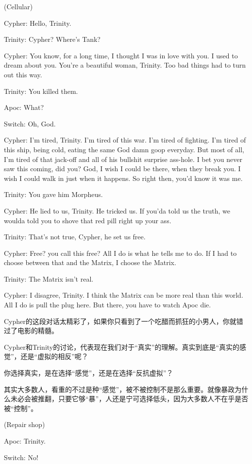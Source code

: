 \documentclass{ctexart}
\newenvironment{myquote}{\color{green} \setlength{\leftskip}{6em} \setlength{\rightskip}{4em} \setlength{\parindent}{-2em}}{\par}
\begin{document}
\begin{myquote}
(Cellular)

Cypher: Hello, Trinity.

Trinity: Cypher? Where's Tank?

Cypher: You know, for a long time, I thought I was in love with you. I used to dream about you. You're a beautiful woman, Trinity. Too bad things had to turn out this way.

Trinity: You killed them.

Apoc: What?

Switch: Oh, God.

Cypher: I'm tired, Trinity. I'm tired of this war. I'm tired of fighting. I'm tired of this ship, being cold, eating the same God damn goop everyday. But most of all, I'm tired of that jack-off and all of his bullshit surprise ass-hole. I bet you never saw this coming, did you? God, I wish I could be there, when they break you. I wish I could walk in just when it happens. So right then, you'd know it was me.

Trinity: You gave him Morpheus.

Cypher: He lied to us, Trinity. He tricked us. If you'da told us the truth, we woulda told you to shove that red pill right up your ass.

Trinity: That's not true, Cypher, he set us free.

Cypher: Free? you call this free? All I do is what he tells me to do. If I had to choose between that and the Matrix, I choose the Matrix.

Trinity: The Matrix isn't real.

Cypher: I disagree, Trinity. I think the Matrix can be more real than this world. All I do is pull the plug here. But there, you have to watch Apoc die.
\end{myquote}

Cypher的这段对话太精彩了，如果你只看到了一个吃醋而抓狂的小男人，你就错过了电影的精髓。

Cypher和Trinity的讨论，代表现在我们对于“真实”的理解。真实到底是“真实的感觉”，还是“虚拟的相反”呢？

你选择真实，是在选择“感觉”，还是在选择“反抗虚拟”？

其实大多数人，看重的不过是种“感觉”，被不被控制不是那么重要。就像暴政为什么未必会被推翻，只要它够“暴”，人还是宁可选择低头，因为大多数人不在乎是否被“控制”。

\begin{myquote}
(Repair shop)

Apoc: Trinity.

Switch: No!
\end{myquote}
\end{document}
